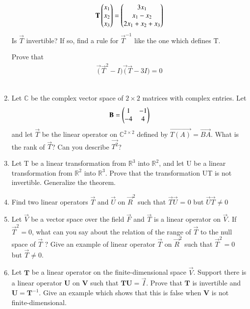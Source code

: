 \begin{enumerate}[label=\thesubsection.\arabic*.,ref=\thesubsection.\theenumi]
\begin{align*}
	\mathbf{T}\begin{pmatrix}x_1\\x_2\\x_3\end{pmatrix}=\begin{pmatrix}3x_1\\x_1-x_2\\2x_1+x_2+x_3\end{pmatrix}
\end{align*}
Is $\vec{T}$ invertible? If so, find a rule for $\vec{T}^{-1}$ like the one which defines T.
%
\\
\solution

Prove that
\begin{align}
    \vec(\vec{T}^{2}-I)\vec(\vec{T}-3I)=0
\end{align}
%
\\
\solution

%
\item Let $\mathbb{C}$ be the complex vector space of $2\times2$ matrices with complex entries. Let
\begin{align}
	\mathbf{B} = \begin{pmatrix}1 & -1 \\ -4 & 4\end{pmatrix}
\end{align}
and let $\vec{T}$ be the linear operator on $\mathbb{C}^{2\times2}$  defined by $\vec{T(A)} = \vec{BA}$. What is the rank of $\vec{T}$? Can you describe $\vec{T^2}$?   
%
\\
\solution

%
\item Let T be a linear transformation from $\mathbb{R}^3$ into $\mathbb{R}^2$, and let U be a linear transformation from $\mathbb{R}^2$ into $\mathbb{R}^3$. Prove that the transformation UT is not invertible. Generalize the theorem.
%
\\
\solution

%
\item Find two linear operators $\vec{T}$ and $\vec{U}$ on $\vec{R}^2$ such that $\vec{T}\vec{U}$ = 0 but $\vec{U}\vec{T} \neq 0$
%
\\
\solution

%
\item Let $\vec{V}$ be a vector space over the field $\vec{F}$ and $\vec{T}$ is a linear operator on $\vec{V}$. If $\vec{T}^2=0$, what can you say about the relation of the range of $\vec{T}$ to the null space of $\vec{T}$ ?
Give an example of linear operator $\vec{T}$ on $\vec{R}^2$ such that $\vec{T}^2=0$ but $\vec{T}\ne0$.
%
\\
\solution

\item Let $\mathbf{T}$ be a linear operator on the finite-dimensional space $\vec{V}$. Support there is a linear operator $\mathbf{U}$ on $\mathbf{V}$ such that $\mathbf{TU} = \vec{I}$. Prove that $\mathbf{T}$ is invertible and $\mathbf{U} = \mathbf{T}^{-1}$. Give an example which shows that this is false when $\mathbf{V}$ is not finite-dimensional.
\\
\solution 	
%



\end{enumerate}
